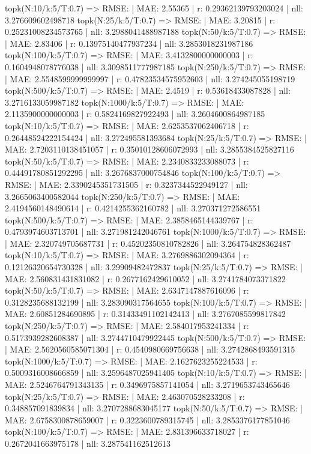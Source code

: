 topk(N:10/k:5/T:0.7) => RMSE: | MAE: 2.55365 | r: 0.29362139793203024 | nll: 3.276609602498718
topk(N:25/k:5/T:0.7) => RMSE: | MAE: 3.20815 | r: 0.25231008234573765 | nll: 3.2988041488987188
topk(N:50/k:5/T:0.7) => RMSE: | MAE: 2.83406 | r: 0.13975140477937234 | nll: 3.2853018231987186
topk(N:100/k:5/T:0.7) => RMSE: | MAE: 3.4132800000000003 | r: 0.1604948078776038 | nll: 3.3098511777987185
topk(N:250/k:5/T:0.7) => RMSE: | MAE: 2.5548599999999997 | r: 0.47823534575952603 | nll: 3.274245055198719
topk(N:500/k:5/T:0.7) => RMSE: | MAE: 2.4519 | r: 0.53618433087828 | nll: 3.2716133059987182
topk(N:1000/k:5/T:0.7) => RMSE: | MAE: 2.1135900000000003 | r: 0.5824169827922493 | nll: 3.2604600864987185
topk(N:10/k:5/T:0.7) => RMSE: | MAE: 2.6253537062406718 | r: 0.26448524222154424 | nll: 3.272495581393684
topk(N:25/k:5/T:0.7) => RMSE: | MAE: 2.7203110138451057 | r: 0.35010128606072993 | nll: 3.2855384525827116
topk(N:50/k:5/T:0.7) => RMSE: | MAE: 2.2340833233088073 | r: 0.44491780851292295 | nll: 3.2676837000754846
topk(N:100/k:5/T:0.7) => RMSE: | MAE: 2.3390245351731505 | r: 0.3237344522949127 | nll: 3.2665063400582044
topk(N:250/k:5/T:0.7) => RMSE: | MAE: 2.4194560148490614 | r: 0.4214255362160782 | nll: 3.270371272586551
topk(N:500/k:5/T:0.7) => RMSE: | MAE: 2.3858465144339767 | r: 0.4793974603713701 | nll: 3.271981242046761
topk(N:1000/k:5/T:0.7) => RMSE: | MAE: 2.320749705687731 | r: 0.45202350810782826 | nll: 3.264754828362487
topk(N:10/k:5/T:0.7) => RMSE: | MAE: 3.2769886302094364 | r: 0.12126320654730328 | nll: 3.29909482472837
topk(N:25/k:5/T:0.7) => RMSE: | MAE: 2.560831431831082 | r: 0.2677162429610052 | nll: 3.2741784073371822
topk(N:50/k:5/T:0.7) => RMSE: | MAE: 2.6347147887616096 | r: 0.3128235688132199 | nll: 3.283090317564655
topk(N:100/k:5/T:0.7) => RMSE: | MAE: 2.60851284690895 | r: 0.31433491102142413 | nll: 3.2767085599817842
topk(N:250/k:5/T:0.7) => RMSE: | MAE: 2.584017953241334 | r: 0.5173939282608387 | nll: 3.2744710479922445
topk(N:500/k:5/T:0.7) => RMSE: | MAE: 2.5620560585071304 | r: 0.4540980669756638 | nll: 3.2742868493591315
topk(N:1000/k:5/T:0.7) => RMSE: | MAE: 2.1627623255224533 | r: 0.5009316008666859 | nll: 3.2596487025941405
topk(N:10/k:5/T:0.7) => RMSE: | MAE: 2.5246764791343135 | r: 0.3496975857141054 | nll: 3.2719653743465646
topk(N:25/k:5/T:0.7) => RMSE: | MAE: 2.463070528233208 | r: 0.348857091839834 | nll: 3.2707288683045177
topk(N:50/k:5/T:0.7) => RMSE: | MAE: 2.6758300878659007 | r: 0.3223600789315745 | nll: 3.2853376177851046
topk(N:100/k:5/T:0.7) => RMSE: | MAE: 2.831396633718027 | r: 0.2672041663975178 | nll: 3.287541162512613
